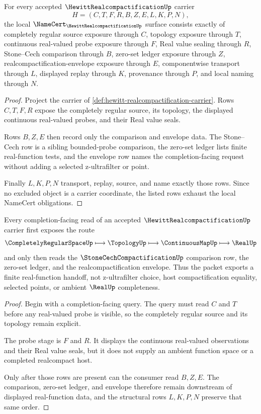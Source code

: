 \begin{theorem}
\label{thm:hewitt-realcompactification-namecert-obligations}
For every accepted $\HewittRealcompactificationUp$ carrier
$$
H=(C,T,F,R,B,Z,E,L,K,P,N),
$$
the local $\NameCert_{\HewittRealcompactificationUp}$ surface consists exactly of completely regular source exposure through $C$, topology exposure through $T$, continuous real-valued probe exposure through $F$, Real value sealing through $R$, Stone--Cech comparison through $B$, zero-set ledger exposure through $Z$, realcompactification-envelope exposure through $E$, componentwise transport through $L$, displayed replay through $K$, provenance through $P$, and local naming through $N$.
\end{theorem}
\begin{proof}
Project the carrier of \autoref{def:hewitt-realcompactification-carrier}. Rows $C,T,F,R$ expose the completely regular source, its topology, the displayed continuous real-valued probes, and their Real value seals.

Rows $B,Z,E$ then record only the comparison and envelope data. The Stone--Cech row is a sibling bounded-probe comparison, the zero-set ledger lists finite real-function tests, and the envelope row names the completion-facing request without adding a selected z-ultrafilter or point.

Finally $L,K,P,N$ transport, replay, source, and name exactly those rows. Since no excluded object is a carrier coordinate, the listed rows exhaust the local NameCert obligations.
\end{proof}

\begin{theorem}
\label{thm:hewitt-realcompactification-real-function-handoff}
Every completion-facing read of an accepted $\HewittRealcompactificationUp$ carrier first exposes the route
$$
\CompletelyRegularSpaceUp \longmapsto \TopologyUp \longmapsto \ContinuousMapUp \longmapsto \RealUp
$$
and only then reads the $\StoneCechCompactificationUp$ comparison row, the zero-set ledger, and the realcompactification envelope. Thus the packet exports a finite real-function handoff, not z-ultrafilter choice, host compactification equality, selected points, or ambient $\RealUp$ completeness.
\end{theorem}
\begin{proof}
Begin with a completion-facing query. The query must read $C$ and $T$ before any real-valued probe is visible, so the completely regular source and its topology remain explicit.

The probe stage is $F$ and $R$. It displays the continuous real-valued observations and their Real value seals, but it does not supply an ambient function space or a completed realcompact host.

Only after those rows are present can the consumer read $B,Z,E$. The comparison, zero-set ledger, and envelope therefore remain downstream of displayed real-function data, and the structural rows $L,K,P,N$ preserve that same order.
\end{proof}

